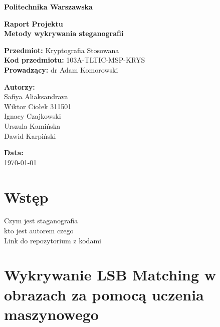 \documentclass[a4paper,12pt]{article}
\begin{document}
\begin{titlepage}
    \begin{center}
        \vspace*{1cm}
        
        \textbf{\Huge Politechnika Warszawska}\\
        \vspace{2cm}
        
        \textbf{\LARGE Raport Projektu}\\
        \vspace{0.5cm}
        \textbf{\Large Metody wykrywania steganografii}\\
        
        \vspace{2cm}
        
        \textbf{Przedmiot:} Kryptografia Stosowana \\
        \textbf{Kod przedmiotu:} 103A-TLTIC-MSP-KRYS \\
        \textbf{Prowadzący:} dr Adam Komorowski \\
        
        \vfill
        
        \textbf{Autorzy:}\\
        \vspace{0.5cm}
        Safiya Aliaksandrava\\
        Wiktor Ciołek 311501\\
        Ignacy Czajkowski\\
        Urszula Kamińska\\
        Dawid Karpiński\\
        
        \vspace{1cm}
        
        \textbf{Data:} \\
        \today
        
        \vspace{2cm}
    \end{center}
\end{titlepage}

\section{Wstęp}
Czym jest staganografia\\
kto jest autorem czego\\
Link do repozytorium z kodami

\section{Wykrywanie LSB Matching w obrazach za pomocą uczenia maszynowego}
\end{document}
